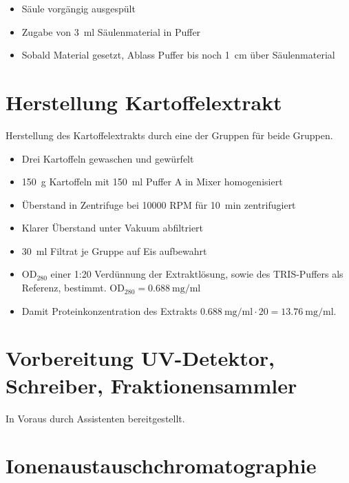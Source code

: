 \documentclass[a4paper,german]{scrreprt}
\begin{document}
\begin{itemize}
	\item Säule vorgängig ausgespült
	\item Zugabe von \SI{3}{ml} Säulenmaterial in Puffer
	\item Sobald Material gesetzt, Ablass Puffer bis noch \SI{1}{cm} über Säulenmaterial
\end{itemize}

\section{Herstellung Kartoffelextrakt}

Herstellung des Kartoffelextrakts durch eine der Gruppen für beide Gruppen.

\begin{itemize}
	\item Drei Kartoffeln gewaschen und gewürfelt
	\item \SI{150}{g} Kartoffeln mit \SI{150}{ml} Puffer A in Mixer homogenisiert
	\item Überstand in Zentrifuge bei 10000 RPM für \SI{10}{min} zentrifugiert
	\item Klarer Überstand unter Vakuum abfiltriert
	\item \SI{30}{ml} Filtrat je Gruppe auf Eis aufbewahrt
	\item $\text{OD}_{280}$ einer 1:20 Verdünnung der Extraktlösung, sowie
		des TRIS-Puffers als Referenz, bestimmt. $\text{OD}_{280} =
		\SI{0.688}{\mg \per \ml}$
	\item Damit Proteinkonzentration des Extrakts $\SI{0.688}{\mg \per \ml}
		\cdot 20 = \SI{13.76}{\mg \per \ml}$.
\end{itemize}

\section{Vorbereitung UV-Detektor, Schreiber, Fraktionensammler}

In Voraus durch Assistenten bereitgestellt.

\section{Ionenaustauschchromatographie}
\end{document}
